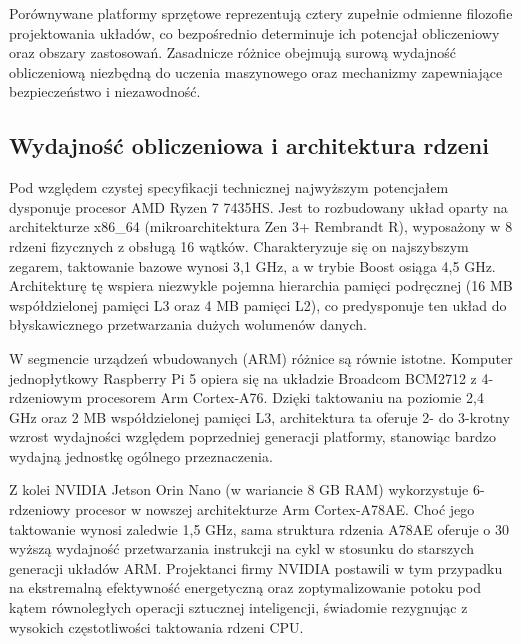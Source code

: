 \documentclass[12pt,twoside]{article}
\begin{document}
Porównywane platformy sprzętowe reprezentują cztery zupełnie odmienne filozofie projektowania układów, co bezpośrednio determinuje ich potencjał obliczeniowy oraz obszary zastosowań. Zasadnicze różnice obejmują surową wydajność obliczeniową niezbędną do uczenia maszynowego oraz mechanizmy zapewniające bezpieczeństwo i niezawodność.

\subsection{Wydajność obliczeniowa i architektura rdzeni}
Pod względem czystej specyfikacji technicznej najwyższym potencjałem dysponuje procesor AMD Ryzen 7 7435HS. Jest to rozbudowany układ oparty na architekturze x86\_64 (mikroarchitektura Zen 3+ Rembrandt R), wyposażony w 8 rdzeni fizycznych z obsługą 16 wątków. Charakteryzuje się on najszybszym zegarem, taktowanie bazowe wynosi 3,1 GHz, a w trybie Boost osiąga 4,5 GHz. Architekturę tę wspiera niezwykle pojemna hierarchia pamięci podręcznej (16 MB współdzielonej pamięci L3 oraz 4 MB pamięci L2), co predysponuje ten układ do błyskawicznego przetwarzania dużych wolumenów danych.

W segmencie urządzeń wbudowanych (ARM) różnice są równie istotne. Komputer jednopłytkowy Raspberry Pi 5 opiera się na układzie Broadcom BCM2712 z 4-rdzeniowym procesorem Arm Cortex-A76. Dzięki taktowaniu na poziomie 2,4 GHz oraz 2 MB współdzielonej pamięci L3, architektura ta oferuje 2- do 3-krotny wzrost wydajności względem poprzedniej generacji platformy, stanowiąc bardzo wydajną jednostkę ogólnego przeznaczenia.

Z kolei NVIDIA Jetson Orin Nano (w wariancie 8 GB RAM) wykorzystuje 6-rdzeniowy procesor w nowszej architekturze Arm Cortex-A78AE. Choć jego taktowanie wynosi zaledwie 1,5 GHz, sama struktura rdzenia A78AE oferuje o 30 wyższą wydajność przetwarzania instrukcji na cykl w stosunku do starszych generacji układów ARM. Projektanci firmy NVIDIA postawili w tym przypadku na ekstremalną efektywność energetyczną oraz zoptymalizowanie potoku pod kątem równoległych operacji sztucznej inteligencji, świadomie rezygnując z wysokich częstotliwości taktowania rdzeni CPU.
\end{document}

